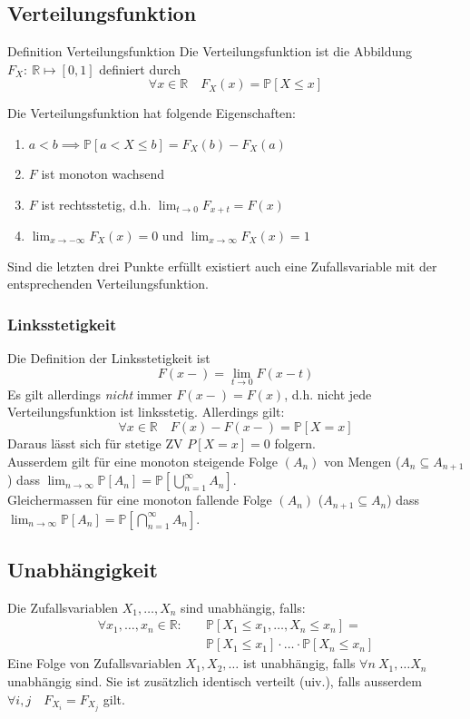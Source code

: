 \documentclass[a4paper,10pt]{article}
\def\R{\mathbb{R}}
\def\P{\mathbb{P}}
\begin{document}
\subsection{Verteilungsfunktion}
\begin{mainbox}{Definition Verteilungsfunktion}
	Die Verteilungsfunktion ist die Abbildung \(F_X: \ \R \mapsto [0,1]\) definiert durch
	\[\forall x \in \R \quad F_X(x) = \P[X \le x]\]
\end{mainbox}
Die Verteilungsfunktion hat folgende Eigenschaften:
\begin{enumerate}
	\item \(a < b \implies \P[a < X \le b] = F_X(b) - F_X(a)\)
	\item \(F\) ist monoton wachsend
	\item \(F\) ist rechtsstetig, d.h. \(\lim_{t \to 0} F_{x+t} = F(x)\)
	\item \(\lim_{x\to - \infty} F_X(x) = 0\) und \(\lim_{x\to \infty} F_X(x) = 1\)
\end{enumerate}

Sind die letzten drei Punkte erfüllt existiert auch eine Zufallsvariable mit der entsprechenden Verteilungsfunktion. 

\subsubsection*{Linksstetigkeit}
Die Definition der Linksstetigkeit ist
\[F(x-) = \lim_{t\to 0} F(x-t)\]
Es gilt allerdings \textit{nicht} immer \(F(x-) = F(x)\), d.h. nicht jede Verteilungsfunktion ist linksstetig. Allerdings gilt:
\[\forall x \in \R \quad F(x) - F(x-) = \P[X=x]\]
Daraus lässt sich für stetige ZV \(P[X=x] = 0\) folgern.\\
Ausserdem gilt für eine monoton steigende Folge $(A_n)$ von Mengen ($A_n \subseteq A_{n+1}$) dass $\lim_{n \to \infty} \P[A_n] = \P[\bigcup_{n=1}^\infty A_n]$.\\
Gleichermassen für eine monoton fallende Folge $(A_n)$ ($A_{n+1} \subseteq A_n$) dass $\lim_{n \to \infty} \P[A_n] = \P[\bigcap_{n=1}^\infty A_n]$.

\subsection{Unabhängigkeit}
Die Zufallsvariablen \(X_1, \ldots, X_n\) sind unabhängig, falls:
\begin{align*}
	\forall x_1, \ldots, x_n \in \R: \quad & \P[X_1 \le x_1, \ldots, X_n \le x_n] =             \\
	                                       & \P[X_1 \le x_1] \cdot \ldots \cdot \P[X_n \le x_n]
\end{align*}
Eine Folge von Zufallsvariablen \(X_1, X_2, \ldots\) ist unabhängig, falls \(
\forall n \ X_1, \ldots X_n\) unabhängig sind. Sie ist zusätzlich identisch verteilt (uiv.), falls ausserdem \(\forall i,j \quad F_{X_i} = F_{X_j}\) gilt.
\end{document}

